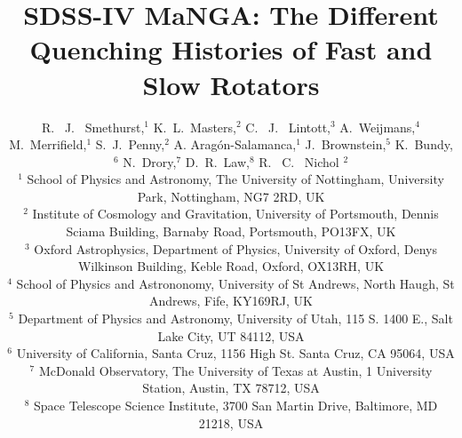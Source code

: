 \documentclass[useAMS,usenatbib]{mn2e}
\begin{document}
\title[Quenching Histories of Fast and Slow Rotators]{SDSS-IV MaNGA: The Different Quenching Histories of Fast and Slow Rotators}
\author[Smethurst et al. 2017]{R. ~J. ~Smethurst,$^{1}$ K.~L.~Masters,$^{2}$  C. ~J. ~Lintott,$^{3}$ A.~Weijmans,$^{4}$  M.~Merrifield,$^{1}$ \newauthor S.~J.~Penny,$^{2}$ A. Arag\'on-Salamanca,$^{1}$  J.~Brownstein,$^{5}$ K.~Bundy,$^{6}$  N.~Drory,$^{7}$ \newauthor  D.~R.~Law,$^{8}$ R. ~C. ~Nichol $^{2}$ 
\\ $^1$ School of Physics and Astronomy, The University of Nottingham, University Park, Nottingham, NG7 2RD, UK
\\ $^2$ Institute of Cosmology and Gravitation, University of Portsmouth, Dennis Sciama Building, Barnaby Road, Portsmouth, PO13FX, UK 
\\ $^3$ Oxford Astrophysics, Department of Physics, University of Oxford, Denys Wilkinson Building, Keble Road, Oxford, OX13RH, UK
\\ $^4$ School of Physics and Astrononomy, University of St Andrews, North Haugh, St Andrews, Fife, KY169RJ, UK
\\ $^5$ Department of Physics and Astronomy, University of Utah, 115 S. 1400 E., Salt Lake City, UT 84112, USA
\\ $^6$ 	University of California, Santa Cruz, 1156 High St. Santa Cruz, CA 95064, USA
\\ $^7$ McDonald Observatory, The University of Texas at Austin, 1 University Station, Austin, TX 78712, USA
\\ $^8$ Space Telescope Science Institute, 3700 San Martin Drive, Baltimore, MD 21218, USA
}

\maketitle
\end{document}
